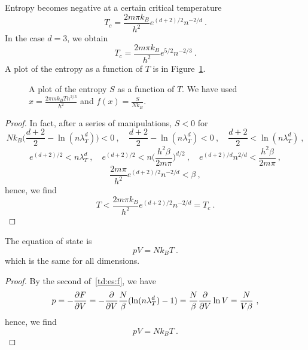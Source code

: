     Entropy becomes negative at a certain critical temperature
    \begin{equation*}
        T_c = \frac{2 m \pi k_B}{h^2} e^{(d+2)/2} n^{-2/d} ~.
    \end{equation*}
    In the case $d=3$, we obtain 
    \begin{equation*}
        T_c = \frac{2 m \pi k_B}{h^2} e^{5/2} n^{-2/3} ~.
    \end{equation*}
    A plot of the entropy as a function of $T$ is in Figure~\ref{fig:c:ent}.
    \begin{figure}
        \centering
        \caption{A plot of the entropy $S$ as a function of $T$. We have used $x = \frac{2 \pi m k_B T n^{2/3}}{h^2}$ and $f(x) = \frac{S}{N k_B}$.}
        \label{fig:c:ent}
    \end{figure}
    \begin{proof}
        In fact, after a series of manipulations, $S < 0$ for 
        \begin{equation*}
            N k_B \Big ( \frac{d+2}{2} - \ln (n \lambda_T^d) \Big ) < 0 ~, \quad \frac{d+2}{2} - \ln (n \lambda_T^d) < 0 ~, \quad \frac{d+2}{2} < \ln (n \lambda_T^d) ~,
        \end{equation*}
        \begin{equation*}
            e^{(d+2)/2} < n \lambda_T^d  ~, \quad e^{(d+2)/2} < n \Big ( \frac{h^2 \beta}{2 m \pi} \Big )^{d/2}  ~, \quad e^{(d+2)/d} n^{2/d} < \frac{h^2 \beta}{2 m \pi} ~,
        \end{equation*}
        \begin{equation*}
            \frac{2 m \pi}{h^2} e^{(d+2)/2} n^{-2/d} < \beta ~,
        \end{equation*}
        hence, we find
        \begin{equation*}
            T < \frac{2 m \pi k_B}{h^2} e^{(d+2)/2} n^{-2/d} = T_c ~.
        \end{equation*}
    \end{proof}
    The equation of state is 
    \begin{equation}\label{ides}
        p V = N k_B T ~.
    \end{equation}
    which is the same for all dimensions.
    \begin{proof}
        By the second of~\eqref{td:es:f}, we have
        \begin{equation*}
            p = - \frac{\partial F}{\partial V} = - \frac{\partial}{\partial V} \frac{N}{\beta} (\ln (n \lambda_T^d) - 1) = \frac{N}{\beta} \frac{\partial}{\partial V} \ln V = \frac{N}{V \beta} ~,
        \end{equation*}
        hence, we find
        \begin{equation*}
            p V = N k_B T ~.
        \end{equation*}
    \end{proof}

